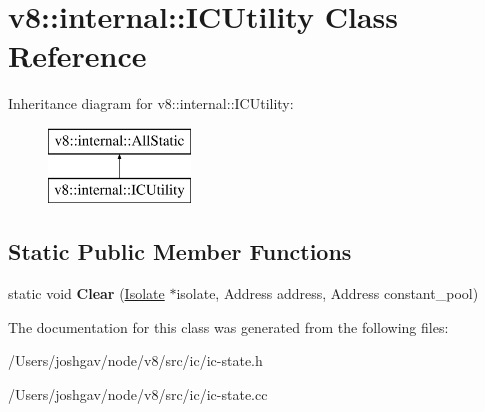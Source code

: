 \hypertarget{classv8_1_1internal_1_1_i_c_utility}{}\section{v8\+:\+:internal\+:\+:I\+C\+Utility Class Reference}
\label{classv8_1_1internal_1_1_i_c_utility}
Inheritance diagram for v8\+:\+:internal\+:\+:I\+C\+Utility\+:\begin{figure}[H]
\begin{center}
\leavevmode
\includegraphics[height=2.000000cm]{classv8_1_1internal_1_1_i_c_utility}
\end{center}
\end{figure}
\subsection*{Static Public Member Functions}
\begin{DoxyCompactItemize}
\item 
static void {\bfseries Clear} (\hyperlink{classv8_1_1internal_1_1_isolate}{Isolate} $\ast$isolate, Address address, Address constant\+\_\+pool)\hypertarget{classv8_1_1internal_1_1_i_c_utility_a916d651cf889369b87791a363d251a50}{}\label{classv8_1_1internal_1_1_i_c_utility_a916d651cf889369b87791a363d251a50}

\end{DoxyCompactItemize}


The documentation for this class was generated from the following files\+:\begin{DoxyCompactItemize}
\item 
/\+Users/joshgav/node/v8/src/ic/ic-\/state.\+h\item 
/\+Users/joshgav/node/v8/src/ic/ic-\/state.\+cc\end{DoxyCompactItemize}
